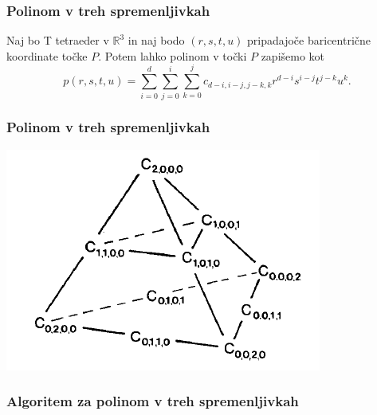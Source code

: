 \documentclass{beamer}
\begin{document}
\begin{frame}
\frametitle{Polinom v treh spremenljivkah}
Naj bo T tetraeder v $\mathbb{R}^3$ in naj bodo $(r,s,t,u)$ pripadajoče baricentrične koordinate točke $P$. Potem lahko polinom v točki $P$ zapišemo kot
$$p(r,s,t,u) = \sum_{i=0}^{d}\sum_{j=0}^{i}\sum_{k=0}^{j}c_{d-i,i-j,j-k,k}r^{d-i}s^{i-j}t^{j-k}u^{k}.$$
\end{frame}


\begin{frame}
\frametitle{Polinom v treh spremenljivkah}
\begin{center}
\includegraphics[width=0.7\linewidth]{tetraeder.PNG}
\end{center}
\end{frame}

\begin{frame}[fragile]
\frametitle{Algoritem za polinom v treh spremenljivkah}
\end{frame}
\end{document}
